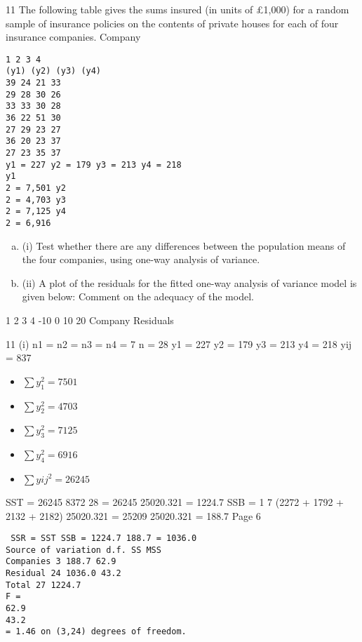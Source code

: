 \documentclass[a4paper,12pt]{article}
\begin{document}
11 
The following table gives the sums insured (in units of £1,000) for a random sample
of insurance policies on the contents of private houses for each of four insurance
companies.
Company
\begin{verbatim}
1 2 3 4
(y1) (y2) (y3) (y4)
39 24 21 33
29 28 30 26
33 33 30 28
36 22 51 30
27 29 23 27
36 20 23 37
27 23 35 37
y1 = 227 y2 = 179 y3 = 213 y4 = 218
y1
2 = 7,501 y2
2 = 4,703 y3
2 = 7,125 y4
2 = 6,916
\end{verbatim}

\begin{enumerate}[(a)]
\item (i) Test whether there are any differences between the population means of the
four companies, using one-way analysis of variance.
\item 
(ii) A plot of the residuals for the fitted one-way analysis of variance model is
given below:
Comment on the adequacy of the model. 
\end{enumerate}

1 2 3 4
-10
0
10
20
Company
Residuals
\newpage

11 (i) n1 = n2 = n3 = n4 = 7 n = 28
y1 = 227 y2 = 179 y3 = 213 y4 = 218 yij = 837

\begin{itemize}
    \item $\sum y_1^2 = 7501$ 
\item $\sum y^2_2 = 4703 $
\item $\sum y_3^2 = 7125 $
\item $\sum y_4^2 = 6916 $
\item $\sum yij^2 = 26245 $
\end{itemize}
SST = 26245
8372
28
= 26245 25020.321 = 1224.7
SSB =
1
7
(2272 + 1792 + 2132 + 2182) 25020.321
= 25209 25020.321 = 188.7
Page 6
\begin{verbatim}
 SSR = SST SSB = 1224.7 188.7 = 1036.0
Source of variation d.f. SS MSS
Companies 3 188.7 62.9
Residual 24 1036.0 43.2
Total 27 1224.7
F =
62.9
43.2
= 1.46 on (3,24) degrees of freedom.   
\end{verbatim}
\end{document}
